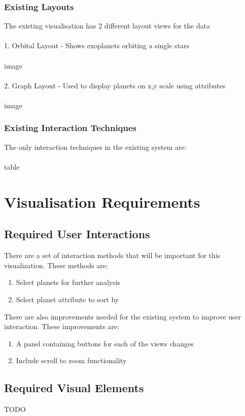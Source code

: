 \documentclass[11pt
              , a4paper
              , twoside
              , openright
              ]{report}
\begin{document}
\subsection{Existing Layouts}
The existing visualisation has 2 different layout views for the data
\\\\
1. Orbital Layout - Shows exoplanets orbiting a single stars\\\\
image
\\\\
2. Graph Layout - Used to display planets on x,y scale using attributes\\\\
image

\subsection{Existing Interaction Techniques}
The only interaction techniques in the existing system are:
\\\\
table
\chapter{Visualisation Requirements}
\section{Required User Interactions}
There are a set of interaction methods that will be important for this visualization. These methods are:
\begin{enumerate}
 \item Select planets for further analysis
 \item Select planet attribute to sort by
\end{enumerate}

There are also improvements needed for the existing system to improve user interaction. These improvements are:
\begin{enumerate}
 \item A panel containing buttons for each of the views changes
 \item Include scroll to zoom functionality
\end{enumerate}
\section{Required Visual Elements}
TODO
\end{document}
